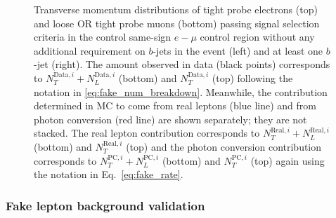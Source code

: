 \begin{figure}[ht]
{}
\caption{Transverse momentum distributions of tight probe 
electrons (top) and loose OR tight probe muons (bottom) passing signal 
selection criteria in the control same-sign $e-\mu$ control region 
without any additional requirement on $b$-jets in the event (left) and 
at least one $b$-jet (right). 
The amount observed in data (black points) corresponds 
to $N_T^{\textrm{Data},i}+N_L^{\textrm{Data},i}$ (bottom) and $N_T^{\textrm{Data},i}$ (top) following the notation
in \eqn\ref{eq:fake_num_breakdown}.
Meanwhile, the contribution determined in MC to come from 
real leptons (blue line) and from photon conversion (red line) are shown 
separately; they are not stacked. The real lepton contribution corresponds to 
$N_T^{\textrm{Real},i}+N_L^{\textrm{Real},i}$ (bottom) and $N_T^{\textrm{Real},i}$ 
(top) and the photon conversion 
contribution 
corresponds to $N_T^{\textrm{PC},i}+N_L^{\textrm{PC},i}$ (bottom) 
and $N_T^{\textrm{PC},i}$ (top) again using the notation 
in Eq.~\ref{eq:fake_rate}. }
\label{fig:fakeEff_CRs_electron}
\end{figure}


\subsubsection{Fake lepton background validation}



